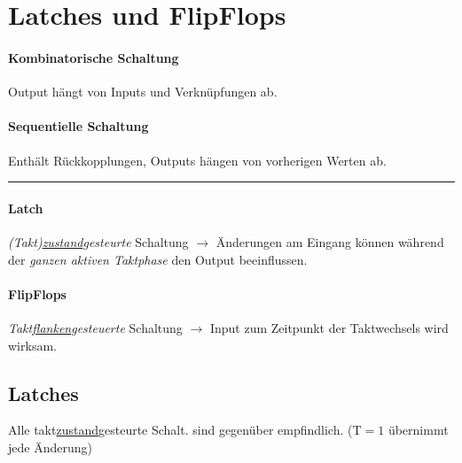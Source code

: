 \section{Latches und FlipFlops}
\begin{center}
    \begin{minipage}[t]{0.45\linewidth}
        \paragraph{Kombinatorische Schaltung}
        Output hängt von Inputs und Verknüpfungen ab.
    \end{minipage}
    \hfill
    \begin{minipage}[t]{0.45\linewidth}
        \paragraph{Sequentielle Schaltung}
        Enthält Rückkopplungen, Outputs hängen von vorherigen Werten ab.
    \end{minipage}
\end{center}
\hrule
\begin{center}
    \begin{minipage}[t]{0.45\linewidth}
        \paragraph{Latch}
        \emph{(Takt)\underline{zustand}gesteurte} Schaltung $\rightarrow$ Änderungen am Eingang können während der \emph{ganzen aktiven Taktphase} den Output beeinflussen.
    \end{minipage}
    \hfill
    \begin{minipage}[t]{0.45\linewidth}
        \paragraph{FlipFlops}
        \emph{Takt\underline{flanken}gesteuerte} Schaltung $\rightarrow$ Input zum Zeitpunkt der Taktwechsels wird wirksam.
    \end{minipage}
\end{center}
\subsection{Latches}
Alle takt\underline{zustand}gesteurte Schalt. sind gegenüber  empfindlich. ($\text{T}=1$ übernimmt jede Änderung)
